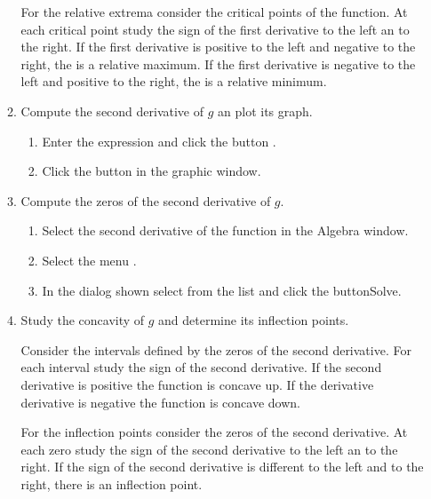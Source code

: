\begin{enumerate}[leftmargin=*]
\begin{enumerate}
\begin{indication}
For the relative extrema consider the critical points of the function.
At each critical point study the sign of the first derivative to the left an to the right.
If the first derivative is positive to the left and negative to the right, the is a relative maximum.
If the first derivative is negative to the left and positive to the right, the is a relative minimum.
\end{indication}

\item Compute the second derivative of $g$ an plot its graph.
\begin{indication}
\begin{enumerate}
\item Enter the expression  and click the button .
\item Click the button  in the graphic window.
\end{enumerate}
\end{indication}

\item Compute the zeros of the second derivative of $g$.
\begin{indication}
\begin{enumerate}
\item Select the second derivative of the function in the Algebra window.
\item Select the menu .
\item In the dialog shown select  from the  list and click the button{Solve}.
\end{enumerate}
\end{indication}

\item Study the concavity of $g$ and determine its inflection points.
\begin{indication}
Consider the intervals defined by the zeros of the second derivative.
For each interval study the sign of the second derivative.
If the second derivative is positive the function is concave up.
If the derivative derivative is negative the function is concave down.

For the inflection points consider the zeros of the second derivative.
At each zero study the sign of the second derivative to the left an to the right.
If the sign of the second derivative is different to the left and to the right, there is an inflection point.
\end{indication}
\end{enumerate}

\end{enumerate}


